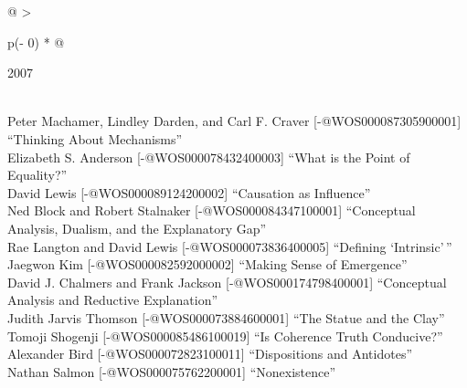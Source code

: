 \documentclass[
  10pt,
  letterpaper,
  DIV=11,
  numbers=noendperiod,
  twoside]{scrartcl}
\begin{document}
\begin{longtable}[]{@{}
  >{\raggedright\arraybackslash}p{(\columnwidth - 0\tabcolsep) * }@{}}

\caption{\label{tbl-top-ten-1998}Most cited articles published less than
ten years ago as of 2007.}

\tabularnewline

\toprule\noalign{}
\begin{minipage}[b]{\linewidth}\raggedright
2007
\end{minipage} \\
\midrule\noalign{}
\endhead
\bottomrule\noalign{}
\endlastfoot
Peter Machamer, Lindley Darden, and Carl F. Craver
{[}-@WOS000087305900001{]} ``Thinking About Mechanisms'' \\
Elizabeth S. Anderson {[}-@WOS000078432400003{]} ``What is the Point of
Equality?'' \\
David Lewis {[}-@WOS000089124200002{]} ``Causation as Influence'' \\
Ned Block and Robert Stalnaker {[}-@WOS000084347100001{]} ``Conceptual
Analysis, Dualism, and the Explanatory Gap'' \\
Rae Langton and David Lewis {[}-@WOS000073836400005{]} ``Defining
`Intrinsic'\,'' \\
Jaegwon Kim {[}-@WOS000082592000002{]} ``Making Sense of Emergence'' \\
David J. Chalmers and Frank Jackson {[}-@WOS000174798400001{]}
``Conceptual Analysis and Reductive Explanation'' \\
Judith Jarvis Thomson {[}-@WOS000073884600001{]} ``The Statue and the
Clay'' \\
Tomoji Shogenji {[}-@WOS000085486100019{]} ``Is Coherence Truth
Conducive?'' \\
Alexander Bird {[}-@WOS000072823100011{]} ``Dispositions and
Antidotes'' \\
Nathan Salmon {[}-@WOS000075762200001{]} ``Nonexistence'' \\

\end{longtable}
\end{document}
